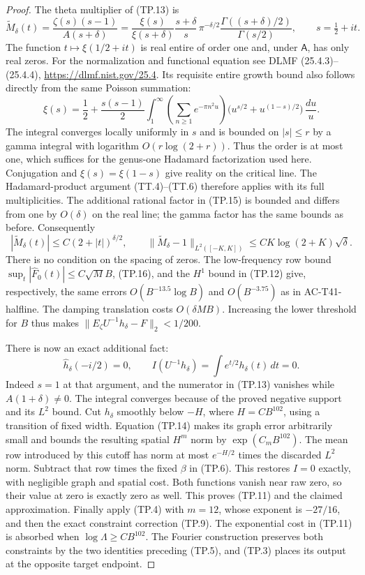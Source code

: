 \begin{proof}
The theta multiplier of (TP.13) is
\[
 \widetilde M_\delta(t)
 =\frac{\zeta(s)(s-1)}{A(s+\delta)}
 =\frac{\xi(s)}{\xi(s+\delta)}
       \frac{s+\delta}{s}\,
       \pi^{-\delta/2}
       \frac{\Gamma((s+\delta)/2)}{\Gamma(s/2)},
 \qquad s=\tfrac12+it .
 \tag{TP.15}
\]
The function \(t\mapsto\xi(1/2+it)\) is real entire
of order one and, under \(\mathsf A\), has only real
zeros.  For the normalization and functional equation
see DLMF (25.4.3)--(25.4.4),
\url{https://dlmf.nist.gov/25.4}.
Its requisite entire growth bound also follows
directly from the same Poisson summation:
\[
 \xi(s)=\frac12+\frac{s(s-1)}2
       \int_1^\infty
       \left(\sum_{n\geq1}e^{-\pi n^2u}\right)
       \bigl(u^{s/2}+u^{(1-s)/2}\bigr)\,\frac{du}{u}.
\]
The integral converges locally uniformly in \(s\)
and is bounded on \(|s|\leq r\) by a gamma integral
with logarithm \(O(r\log(2+r))\).
Thus the order is at most one, which suffices for
the genus-one Hadamard factorization used here.
Conjugation and \(\xi(s)=\xi(1-s)\) give reality on
the critical line.  The Hadamard-product argument (TT.4)--(TT.6)
therefore applies with its full multiplicities.
The additional rational factor in (TP.15) is bounded
and differs from one by \(O(\delta)\) on the real
line; the gamma factor has the same bounds as before.
Consequently
\[
 |\widetilde M_\delta(t)|
       \leq C(2+|t|)^{\delta/2},\qquad
 \|\widetilde M_\delta-1\|_{L^2([-K,K])}
             \leq C K\log(2+K)\sqrt{\delta}.
 \tag{TP.16}
\]
There is no condition on the spacing of zeros.
The low-frequency row bound
\(\sup_t|\widehat F_0(t)|\leq C\sqrt M B\),
(TP.16), and the \(H^1\) bound in (TP.12) give,
respectively, the same errors
\(O(B^{-13.5}\log B)\) and \(O(B^{-3.75})\)
as in AC-T41-halfline.  The damping translation
costs \(O(\delta MB)\).
Increasing the lower threshold for \(B\) thus makes
\(\|E_\zeta U^{-1}h_\delta-F\|_2<1/200\).

There is now an exact additional fact:
\[
 \widehat h_\delta(-i/2)=0,\qquad
       I(U^{-1}h_\delta)
           =\int e^{t/2}h_\delta(t)\,dt=0 .
 \tag{TP.17}
\]
Indeed \(s=1\) at that argument, and the numerator
in (TP.13) vanishes while \(A(1+\delta)\ne0\).
The integral converges because of the proved negative
support and its \(L^2\) bound.
Cut \(h_\delta\) smoothly below \(-H\), where
\(H=CB^{102}\), using a transition of fixed width.
Equation (TP.14) makes its graph error arbitrarily
small and bounds the resulting spatial \(H^m\)
norm by \(\exp(C_mB^{102})\).
The mean row introduced by this cutoff has norm at
most \(e^{-H/2}\) times the discarded \(L^2\) norm.
Subtract that row times the fixed \(\beta\) in
(TP.6).  This restores \(I=0\) exactly, with
negligible graph and spatial cost.
Both functions vanish near raw zero, so their
value at zero is exactly zero as well.
This proves (TP.11) and the claimed approximation.
Finally apply (TP.4) with \(m=12\), whose exponent
is \(-27/16\), and then the exact constraint
correction (TP.9).  The exponential cost in (TP.11)
is absorbed when \(\log\Lambda\geq CB^{102}\).
The Fourier construction preserves both constraints
by the two identities preceding (TP.5), and (TP.3)
places its output at the opposite target endpoint.
\end{proof}


